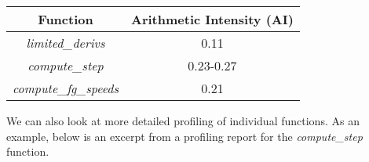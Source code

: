 \begin{center}
\begin{tabular}{ |c|c| } 
 \hline
 Function & Arithmetic Intensity (AI) \\ 
 \hline
 \emph{limited\_derivs} & 0.11 \\ 
 \emph{compute\_step} & 0.23-0.27 \\ 
 \emph{compute\_fg\_speeds} & 0.21 \\ 
 \hline
\end{tabular}
\end{center}



We can also look at more detailed profiling of individual functions.
As an example, below is an excerpt from a profiling report for the 
\emph{compute\_step} function.

